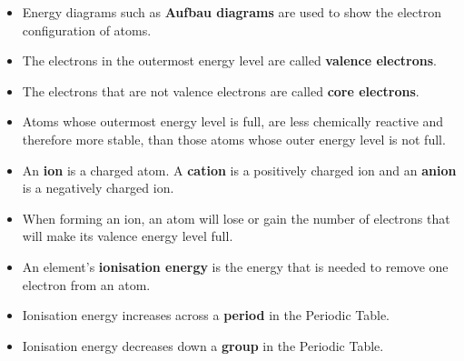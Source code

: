 \begin{itemize}
\item{Energy diagrams such as \textbf{Aufbau diagrams} are used to show the electron configuration of atoms.}
\item{The electrons in the outermost energy level are called \textbf{valence electrons}.}
\item{The electrons that are not valence electrons are called \textbf{core electrons}.}
\item{Atoms whose outermost energy level is full, are less chemically reactive and therefore more stable, than those atoms whose outer energy level is not full.}
\item{An \textbf{ion} is a charged atom. A \textbf{cation} is a positively charged ion and an \textbf{anion} is a negatively charged ion.}
\item{When forming an ion, an atom will lose or gain the number of electrons that will make its valence energy level full.}
\item{An element's \textbf{ionisation energy} is the energy that is needed to remove one electron from an atom.}
\item{Ionisation energy increases across a \textbf{period} in the Periodic Table.}
\item{Ionisation energy decreases down a \textbf{group} in the Periodic Table.}
\end{itemize}

